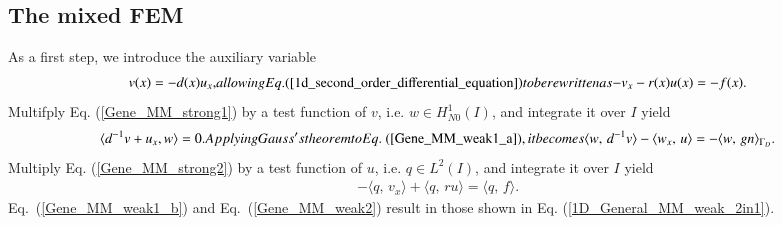 \documentclass[review,3p]{elsarticle}
\begin{document}
\subsection{The mixed FEM}		\label{derivation_weak_form_MM}
As a first step, we introduce the auxiliary variable
\begin{subequations}
\begin{align}
   v(x) = - d(x)u_x, \label{Gene_MM_strong1} 
\end{align}  
allowing Eq. (\ref{1d_second_order_differential_equation}) to be rewritten as
\begin{align}
  -v_x - r(x)u(x) = -f(x).  \label{Gene_MM_strong2}
\end{align}	\label{1D_general_MM_2in1}%
\end{subequations}
Multifply Eq. (\ref{Gene_MM_strong1}) by a test function of $v$, i.e. $w \in H _{N0}^{1}(I)$, and integrate it over $I$ yield
\begin{subequations}
\begin{align}
  \langle d^{-1}v + u _x, w \rangle = 0.	\label{Gene_MM_weak1_a}
\end{align}
Applying Gauss's theorem to Eq.~(\ref{Gene_MM_weak1_a}), it becomes
\begin{align}
 \langle w, \, d^{-1}v \rangle - \langle w_x, \,  u \rangle = -\langle w, \, g n\rangle_{\Gamma_D}.		\label{Gene_MM_weak1_b}
\end{align}				\label{Gene_MM_weak1}%
\end{subequations}
Multiply Eq. (\ref{Gene_MM_strong2}) by a test function of $u$, i.e. $q \in L^2 (I)$, and integrate it over $I$ yield
\begin{align}
- \langle q , \, v_x \rangle + \langle q, \, ru \rangle = \langle q, \, f \rangle. \label{Gene_MM_weak2}
\end{align}
Eq.~(\ref{Gene_MM_weak1_b}) and Eq.~({\ref{Gene_MM_weak2}}) result in those shown in Eq. (\ref{1D_General_MM_weak_2in1}).

  
\end{document}
